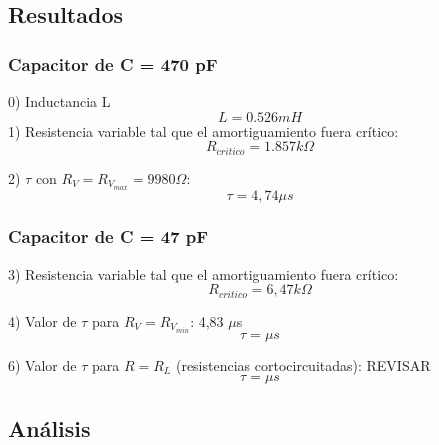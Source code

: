 \documentclass{article}
\begin{document}
            
        \subsection{Resultados}

            \subsubsection*{Capacitor de C = 470 pF}
                0) Inductancia L
                \begin{equation}
                    L=0.526mH
                \end{equation}
                1) Resistencia variable tal que el amortiguamiento fuera crítico:
                \begin{equation}
                    R_{critico} = 1.857 k\Omega
                \end{equation} \par
                2) $ \tau $ con $ R_V = R_{V_{max}} = 9980 \Omega $:
                 \begin{equation}
                    \tau = 4,74 \mu s 
                \end{equation}

            \subsubsection*{Capacitor de C = 47 pF}
                3) Resistencia variable tal que el amortiguamiento fuera crítico:
                \begin{equation}
                    R_{critico} = 6,47 k\Omega 
                \end{equation} \par
                4) Valor de $ \tau $ para $ R_V = R_{V_{min}} $: 4,83 $\mu$s
                \begin{equation}
                    \tau =  \mu s 
                \end{equation} \par
                6) Valor de $ \tau $ para $ R = R_L $ (resistencias cortocircuitadas): REVISAR
                \begin{equation}
                    \tau =  \mu s 
                \end{equation}
        


    \subsection{Análisis}
    
\end{document}
